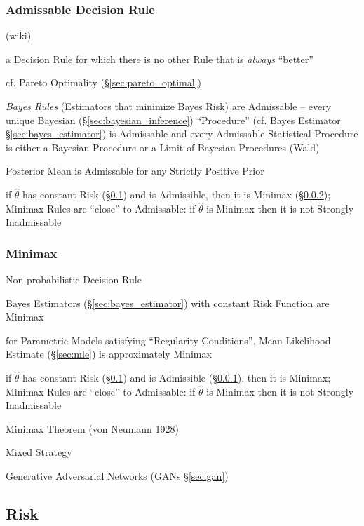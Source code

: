 \subsubsection{Admissable Decision Rule}\label{sec:admissable}

(wiki)

a Decision Rule for which there is no other Rule that is \emph{always}
``better''

cf. Pareto Optimality (\S\ref{sec:pareto_optimal})

\emph{Bayes Rules} (Estimators that minimize Bayes Risk) are Admissable -- every
unique Bayesian (\S\ref{sec:bayesian_inference}) ``Procedure'' (cf. Bayes
Estimator \S\ref{sec:bayes_estimator}) is Admissable and every Admissable
Statistical Procedure is either a Bayesian Procedure or a Limit of Bayesian
Procedures (Wald)

Posterior Mean is Admissable for any Strictly Positive Prior

if $\hat{\theta}$ has constant Risk (\S\ref{sec:risk}) and is Admissible, then
it is Minimax (\S\ref{sec:minimax});
Minimax Rules are ``close'' to Admissable: if $\hat{\theta}$ is Minimax then it
is not Strongly Inadmissable



\subsubsection{Minimax}\label{sec:minimax}

Non-probabilistic Decision Rule

Bayes Estimators (\S\ref{sec:bayes_estimator}) with constant Risk Function are
Minimax

for Parametric Models satisfying ``Regularity Conditions'', Mean Likelihood
Estimate (\S\ref{sec:mle}) is approximately Minimax

if $\hat{\theta}$ has constant Risk (\S\ref{sec:risk}) and is Admissible
(\S\ref{sec:admissable}), then it is Minimax;
Minimax Rules are ``close'' to Admissable: if $\hat{\theta}$ is Minimax then it
is not Strongly Inadmissable

Minimax Theorem (von Neumann 1928)

Mixed Strategy

\fist Generative Adversarial Networks (GANs \S\ref{sec:gan})



\subsection{Risk}\label{sec:risk}

